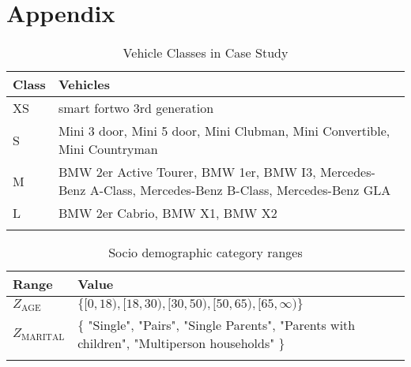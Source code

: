 \clearpage
\section{Appendix}
\label{app:A}

\begin{longtable}{ | l | p{12cm} |}
  \hline
  \textbf{Class} & \textbf{Vehicles} \\
  \hline
  XS & smart fortwo 3rd generation \\
  S & Mini 3 door, Mini 5 door, Mini Clubman, Mini Convertible,  Mini Countryman \\
  M & BMW 2er Active Tourer, BMW 1er, BMW I3, Mercedes-Benz A-Class, Mercedes-Benz B-Class, Mercedes-Benz GLA \\
  L & BMW 2er Cabrio, BMW X1, BMW X2 \\
  \hline

  \caption{Vehicle Classes in Case Study}
  \label{table:VehicleClasses}
\end{longtable}

\begin{longtable}{ | l | p{10cm} |}
  \hline
  \textbf{Range} & \textbf{Value} \\
  \hline
  $Z_{\text{AGE}}$ & $\{ [0, 18), [18, 30), [30, 50), [50, 65), [65, \infty)  \}$ \\
  $Z_{\text{MARITAL}}$ & $\{$ "Single", "Pairs", "Single Parents", "Parents with children", "Multiperson households" $\}$ \\
  \hline

  \caption{Socio demographic category ranges}
  \label{table:Ranges}
\end{longtable}
